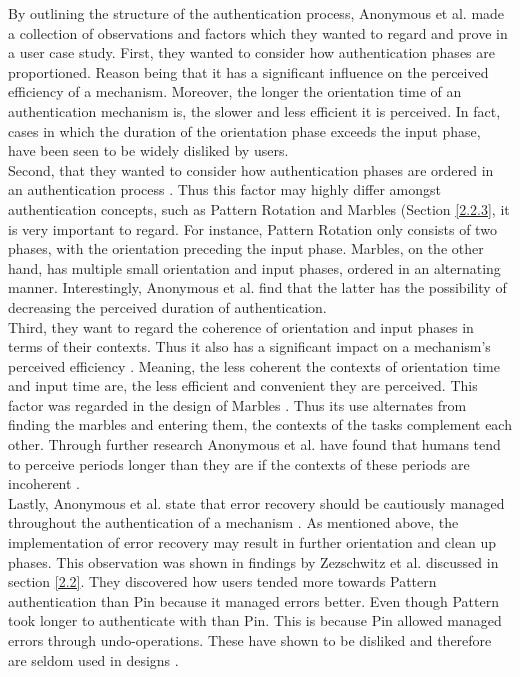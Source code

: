 By outlining the structure of the authentication process, Anonymous et al. \cite{anonymous} made a collection of observations and factors which they wanted to regard and prove in a user case study. First, they wanted to consider how authentication phases are proportioned. Reason being that it has a significant influence on the perceived efficiency of a mechanism. Moreover, the longer the orientation time of an authentication mechanism is, the slower and less efficient it is perceived. In fact, cases in which the duration of the orientation phase exceeds the input phase, have been seen to be widely disliked by users. \\

Second, that they wanted to consider how authentication phases are ordered in an authentication process \cite{anonymous}. Thus this factor may highly differ amongst authentication concepts, such as Pattern Rotation and Marbles \cite{Marbles} (Section \ref{2.2.3}, it is very important to regard. For instance, Pattern Rotation only consists of two phases, with the orientation preceding the input phase. Marbles, on the other hand, has multiple small orientation and input phases, ordered in an alternating manner. Interestingly, Anonymous et al. \cite{anonymous} find that the latter has the possibility of decreasing the perceived duration of authentication. \\

Third, they want to regard the coherence of orientation and input phases in terms of their contexts. Thus it also has a significant impact on a mechanism's perceived efficiency \cite{anonymous}. Meaning, the less coherent the contexts of orientation time and input time are, the less efficient and convenient they are perceived. This factor was regarded in the design of Marbles \cite{Marbles}. Thus its use alternates from finding the marbles and entering them, the contexts of the tasks complement each other. Through further research Anonymous et al. \cite{anonymous} have found that humans tend to perceive periods longer than they are if the contexts of these periods are incoherent \cite{anonymous,perception}.\\

Lastly, Anonymous et al. \cite{anonymous} state that error recovery should be cautiously managed throughout the authentication of a mechanism \cite{anonymous}. As mentioned above, the implementation of error recovery may result in further orientation and clean up phases. This observation was shown in findings by Zezschwitz et al. \cite{PatternWild} discussed in section \ref{2.2}. They discovered how users tended more towards Pattern authentication than Pin because it managed errors better. Even though Pattern took longer to authenticate with than Pin. This is because Pin allowed managed errors through undo-operations. These have shown to be disliked and therefore are seldom used in designs \cite{PatternWild, anonymous}. 

